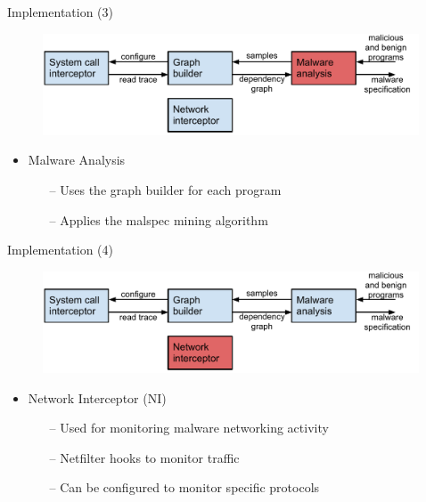 \documentclass{beamer}
\begin{document}
\begin{frame}[t]{Implementation (3)}
  \begin{figure}[p]
    \includegraphics[width=4.4in]{img/mal-sharp-architecture-ma.pdf}
  \end{figure}
  \begin{itemize}
    \item Malware Analysis
    \begin{itemize}
      \item[--] Uses the graph builder for each program
      \item[--] Applies the malspec mining algorithm
    \end{itemize}
  \end{itemize}
\end{frame}

\begin{frame}[t]{Implementation (4)}
  \begin{figure}[p]
    \includegraphics[width=4.4in]{img/mal-sharp-architecture-ni.pdf}
    \end{figure}
  \begin{itemize}
    \item Network Interceptor (NI)
    \begin{itemize}
      \item[--] Used for monitoring malware networking activity
      \item[--] Netfilter hooks to monitor traffic
      \item[--] Can be configured to monitor specific protocols
    \end{itemize}
  \end{itemize}
\end{frame}
\end{document}
